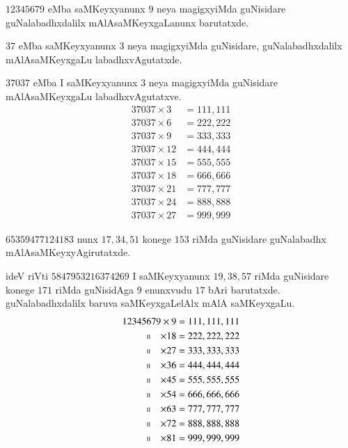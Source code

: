 $12345679$ eMba saMKeyxyanunx $9$ neya magigxyiMda guNisidare guNalabadhxdalilx mAlAsaMKeyxgaLanunx barutatxde.

$37$ eMba saMKeyxyanunx $3$ neya magigxyiMda guNisidare, guNalabadhxdalilx mAlAsaMKeyxgaLu labadhxvAgutatxde.

$37037$ eMba I saMKeyxyanunx $3$ neya magigxyiMda guNisidare \-mAlAsaMKeyxgaLu labadhxvAgutatxve.
\begin{align*}
37037 \times  3&= 111,111 \\
37037 \times  6&= 222,222\\
37037 \times  9&= 333,333\\
37037 \times  12&= 444,444\\
37037 \times  15&= 555,555\\
37037 \times  18&= 666,666\\
37037 \times  21&= 777,777\\
37037 \times  24&= 888,888\\
37037 \times  27&= 999,999
\end{align*}

$65359477124183$ nunx $17,34,51$ konege $153$ riMda guNisidare guNalabadhx mAlAsaMKeyxyAgirutatxde.

ideV riVti $5847953216374269$ I saMKeyxyanunx $19,38,57$ riMda guNisidare konege $171$ riMda guNisidAga $9$ enunxvudu $17$ bAri barutatxde. guNalabadhxdalilx baruva saMKeyxgaLelAlx mAlA saMKeyxgaLu.
\begin{align*}
12345679             \times     9 &= 111,111,111\\
~~~~\shortparallel~~~\times     18 &=222,222,222\\
~~~~\shortparallel~~~\times     27 &=333,333,333 \\
~~~~\shortparallel~~~\times     36 &=444,444,444  \\
~~~~\shortparallel~~~\times     45 &=555,555,555 \\
~~~~\shortparallel~~~\times     54 &=666,666,666 \\
~~~~\shortparallel~~~\times     63 &= 777,777,777\\
~~~~\shortparallel~~~\times     72 &= 888,888,888\\
~~~~\shortparallel~~~\times     81 &= 999,999,999\\
\end{align*}
